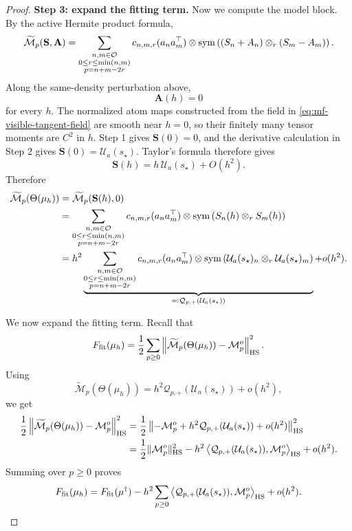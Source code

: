 \begin{proof}
\par\noindent\textbf{Step 3: expand the fitting term.}
Now we compute the model block.  By the active Hermite product formula,
\[
    \widetilde{\mathcal M}_p(\mathbf S,\mathbf A)
    =
    \sum_{\substack{
        n,m\in\mathcal O\\
        0\le r\le \min(n,m)\\
        p=n+m-2r
    }}
    c_{n,m,r}(a_na_m^\top)
    \otimes
    \mathrm{sym}\left({
        (S_n+A_n)\otimes_{r}(S_m-A_m)
    }\right).
\]
Along the same-density perturbation above,
\[
    \mathbf A(h)=0
\]
for every \(h\). The normalized atom maps constructed from the field in
\cref{eq:mf-visible-tangent-field} are smooth near $h=0$, so their finitely
many tensor moments are $C^2$ in $h$. Step 1 gives
$\mathbf S(0)=0$, and the derivative calculation in Step 2 gives
$\dot{\mathbf S}(0)=\mathcal U_a(s_\star)$. Taylor's formula therefore gives
\[
    \mathbf S(h)
    =
    h\,\mathcal U_a(s_\star)+O(h^2).
\]
Therefore
\begin{align}
    \widetilde{\mathcal M}_p(\Theta(\mu_h))
    &=
    \widetilde{\mathcal M}_p(\mathbf S(h),0)
    \\
    &=
    \sum_{\substack{
        n,m\in\mathcal O\\
        0\le r\le \min(n,m)\\
        p=n+m-2r
    }}
    c_{n,m,r}(a_na_m^\top)
    \otimes
    \mathrm{sym}\left({S_n(h)\otimes_{r}S_m(h)}\right)
    \\
    &=
    h^2
    \underbrace{\sum_{\substack{
        n,m\in\mathcal O\\
        0\le r\le \min(n,m)\\
        p=n+m-2r
    }}
    c_{n,m,r}(a_na_m^\top)
    \otimes
    \mathrm{sym}\left({
        \mathcal U_a(s_\star)_n
        \otimes_{r}
        \mathcal U_a(s_\star)_m
    }\right)}_{\eqqcolon  \mathcal Q_{p,+}(\mathcal U_a(s_\star))}
    +
    o(h^2).
\end{align}

We now expand the fitting term.  Recall that
\[
    F_{\mathrm{fit}}(\mu_h)
    =
    \frac12
    \sum_{p\ge0}
    \left\|
        \widetilde{\mathcal M}_p(\Theta(\mu_h))
        -
        \mathcal M_p^o
    \right\|_{\mathrm{HS}}^2.
\]
Using
\[
    \widetilde{\mathcal M}_p(\Theta(\mu_h))
    =
    h^2\mathcal Q_{p,+}(\mathcal U_a(s_\star))
    +
    o(h^2),
\]
we get
\begin{align}
    \frac12
    \left\|
        \widetilde{\mathcal M}_p(\Theta(\mu_h))
        -
        \mathcal M_p^o
    \right\|_{\mathrm{HS}}^2
    &=
    \frac12
    \left\|
        -\mathcal M_p^o
        +
        h^2\mathcal Q_{p,+}(\mathcal U_a(s_\star))
        +
        o(h^2)
    \right\|_{\mathrm{HS}}^2
    \\
    &=
    \frac12\|\mathcal M_p^o\|_{\mathrm{HS}}^2
    -
    h^2
    \left\langle
        \mathcal Q_{p,+}(\mathcal U_a(s_\star)),
        \mathcal M_p^o
    \right\rangle_{\mathrm{HS}}
    +
    o(h^2).
\end{align}
Summing over \(p\ge0\) proves
\[
    F_{\mathrm{fit}}(\mu_h)
    =
    F_{\mathrm{fit}}(\mu^\dagger)
    -
    h^2
    \sum_{p\ge0}
    \left\langle
        \mathcal Q_{p,+}(\mathcal U_a(s_\star)),
        \mathcal M_p^o
    \right\rangle_{\mathrm{HS}}
    +
    o(h^2).
\]



\end{proof}
